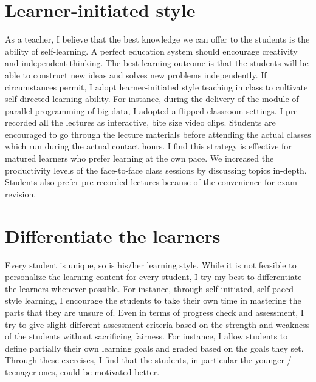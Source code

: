 \documentclass[12pt]{article}
\theoremstyle{plain} \numberwithin{equation}{section}
\theoremstyle{definition}
\begin{document}
\section{Learner-initiated style}
As a teacher, I believe that the best knowledge we can offer
to the students is the ability of self-learning. 
A perfect education system should encourage creativity and independent 
thinking. The best learning outcome is that the students will be able to construct 
new ideas and solves new problems independently. If circumstances
permit, I adopt learner-initiated style teaching in class to cultivate
self-directed learning ability. For instance, during the delivery of
the module of parallel programming of big data, I adopted a flipped
classroom settings. I pre-recorded all the lectures as interactive,
bite size video clips. Students are encouraged to go through the
lecture materials before attending the actual classes which run during
the actual contact hours. I find this strategy is effective for
matured learners who prefer learning at the own pace. We increased the
productivity levels of the face-to-face class sessions by discussing
topics in-depth. Students also prefer pre-recorded lectures because of
the convenience for exam revision.


\section{Differentiate the learners}
Every student is unique, so is his/her learning style. While
it is not feasible to personalize
the learning content for every student, I try my best to differentiate
the learners whenever possible. For instance, through self-initiated,
self-paced style learning, I encourage the students to take their own
time in mastering the parts that they are unsure of. Even in terms of
progress check and assessment, I try to give slight different
assessment criteria based on the strength and weakness of the students
without sacrificing fairness. For instance, I allow students to define
partially their own learning goals and graded based on the goals they
set. Through these exercises, I find that the students, in particular
the younger / teenager ones, could be motivated better.
\end{document}
